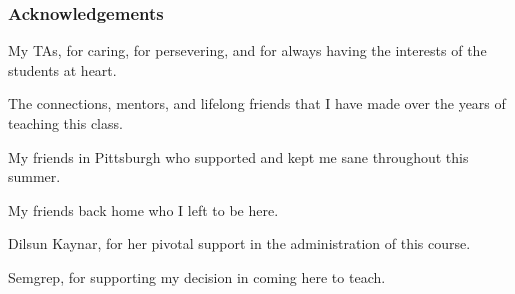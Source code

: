 \documentclass[aspectratio=169, handout]{beamer}
\begin{document}
\begin{frame}[fragile]
  \frametitle{Acknowledgements}

  \begin{center}
    My TAs, for caring, for persevering, and for always having the interests
    of the students at heart.

    \pause
    \vspace{\fill}

    The connections, mentors, and lifelong friends that I have made over
    the years of teaching this class.

    \pause
    \vspace{\fill}

    My friends in Pittsburgh who supported and kept me sane throughout this summer.

    \pause
    \vspace{\fill}

    My friends back home who I left to be here.

    \pause
    \vspace{\fill}

    Dilsun Kaynar, for her pivotal support in the administration of this course.

    \pause
    \vspace{\fill}

    Semgrep, for supporting my decision in coming here to teach.
  \end{center}
\end{frame}
\end{document}
